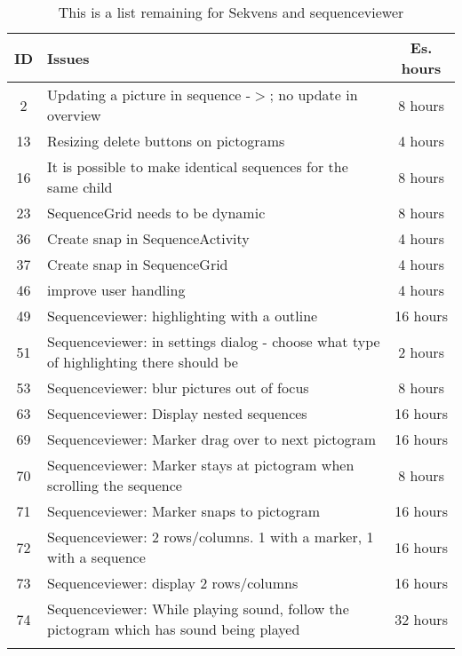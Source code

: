 \begin{longtable} { | c | p{12cm} | c | } 
\hline
	ID 	&	Issues	&	 Es. hours \\\hline
	2	& 	Updating a picture in sequence -$>$; no update in overview	& 	8 hours  \\\hline
	13	& 	Resizing delete buttons on pictograms	& 	4 hours  \\\hline
	16	& 	It is possible to make identical sequences for the same child	& 	8 hours  \\\hline
	23	& 	SequenceGrid needs to be dynamic	& 	8 hours  \\\hline
	36	& 	Create snap in SequenceActivity	& 	4 hours  \\\hline
	37	& 	Create snap in SequenceGrid	& 	4 hours  \\\hline
	46	& 	improve user handling 	& 	4 hours  \\\hline
	49	& 	Sequenceviewer: highlighting with a outline 	& 	16 hours  \\\hline
	51	& 	Sequenceviewer: in settings dialog - choose what type of highlighting there should be	& 	2 hours  \\\hline
	53	& 	Sequenceviewer: blur pictures out of focus	& 	8 hours  \\\hline
	63	& 	Sequenceviewer: Display nested sequences 	& 	16 hours  \\\hline
	69	& 	Sequenceviewer: Marker drag over to next pictogram 	& 	16 hours  \\\hline
	70	& 	Sequenceviewer: Marker stays at pictogram when scrolling the sequence 	& 	8 hours  \\\hline
	71	& 	Sequenceviewer: Marker snaps to pictogram 	& 	16 hours  \\\hline
	72	& 	Sequenceviewer: 2 rows/columns. 1 with a marker, 1 with a sequence 	& 	16 hours  \\\hline
	73	& 	Sequenceviewer: display 2 rows/columns 	& 	16 hours  \\\hline
	74	& 	Sequenceviewer: While playing sound, follow the pictogram which has sound being played 	& 	32 hours  \\\hline
\caption{This is a list remaining for Sekvens and sequenceviewer}
\label{tab:remaining_prodblog}
\end{longtable}


